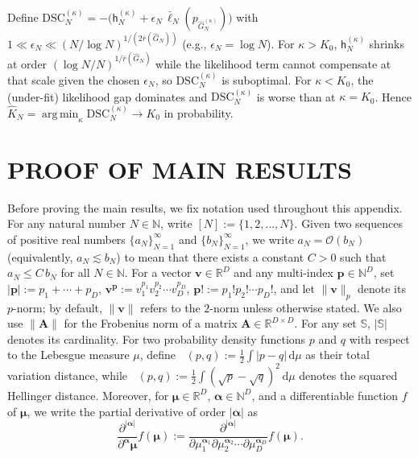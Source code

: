 \documentclass[twoside]{article}
\newcommand{\height}{\mathsf{h}}
\DeclareMathOperator*{\TV}{D_{TV}}
\DeclareMathOperator*{\hels}{D_{h}^2}
\theoremstyle{plain}
\theoremstyle{definition}
\theoremstyle{plain}
\def\vmu{{\bm{\mu}}}
\def\valpha{{\bm{\alpha}}}
\def\vp{{\bm{p}}}
\def\vv{{\bm{v}}}
\def\mA{{\bm{A}}}
\def\sS{{\mathbb{S}}}
\newcommand{\R}{\mathbb{R}}
\newcommand{\Ns}{\mathbb{N}} %
\newcommand{\cO}{\mathcal{O}}
\DeclareMathOperator*{\argmin}{arg\,min}
\begin{document}
Define \(\mathrm{DSC}_N^{(\kappa)}=-\big(\height_N^{(\kappa)}+\epsilon_N\,\bar\ell_N(p_{\widehat G_N^{(\kappa)}})\big)\) with \(1\ll \epsilon_N \ll (N/\log N)^{1/(2\bar r(\widehat G_N))}\) (e.g., \(\epsilon_N=\log N\)).
For \(\kappa>K_0\), \(\height_N^{(\kappa)}\) shrinks at order \((\log N/N)^{1/\bar r(\widehat G_N)}\) while the likelihood term cannot compensate at that scale given the chosen \(\epsilon_N\), so \(\mathrm{DSC}_N^{(\kappa)}\) is suboptimal.
For \(\kappa<K_0\), the (under-fit) likelihood gap dominates and \(\mathrm{DSC}_N^{(\kappa)}\) is worse than at \(\kappa=K_0\).
Hence \(\widehat K_N=\argmin_\kappa \mathrm{DSC}_N^{(\kappa)}\to K_0\) in probability.
\fi

\section{PROOF OF MAIN RESULTS}\label{sec:appendix:proofs-main}

Before proving the main results, we fix notation used throughout this appendix. For any natural number \(N\in\Ns\), write \([N]:=\{1,2,\ldots,N\}\).
Given two sequences of positive real numbers \(\{a_N\}_{N=1}^\infty\) and \(\{b_N\}_{N=1}^\infty\), we write \(a_N=\cO(b_N)\) (equivalently, \(a_N\lesssim b_N\)) to mean that there exists a constant \(C>0\) such that \(a_N\le C\,b_N\) for all \(N\in\Ns\).
For a vector \(\vv\in\R^D\) and any multi-index \(\vp \in \Ns^D\), set \(|\vp|:=p_1+\cdots+p_D\), \(\vv^{\vp} := v_1^{p_1} v_2^{p_2} \cdots v_D^{p_D}\), \(\vp! := p_1! p_2! \cdots p_D!\), and let \(\|\vv\|_{p}\) denote its \(p\)-norm; by default, \(\|\vv\|\) refers to the \(2\)-norm unless otherwise stated.
We also use \(\|\mA\|\) for the Frobenius norm of a matrix \(\mA\in\R^{D\times D}\).
For any set \(\sS\), \(|\sS|\) denotes its cardinality.
For two probability density functions \(p\) and \(q\) with respect to the Lebesgue measure \(\mu\), define \(\TV(p,q) := \tfrac 1 2 \int |p-q|\,\mathrm d\mu\) as their total variation distance, while \(\hels(p,q) := \tfrac 1 2 \int (\sqrt p - \sqrt q)^2\,\mathrm d\mu\) denotes the squared Hellinger distance. Moreover, for \(\vmu \in \R^D\), \(\valpha \in \Ns^D\), and a differentiable function \(f\) of \(\vmu\), we write the partial derivative of order \(|\valpha|\) as
\[
\frac{\partial^{|\valpha|}}{\partial^{\valpha} \vmu} f(\vmu) := \frac{\partial^{|\valpha|}}{\partial \mu_1^{\valpha_1} \partial \mu_2^{\valpha_2} \cdots \partial \mu_D^{\valpha_D}} f(\vmu).
\]
\end{document}
